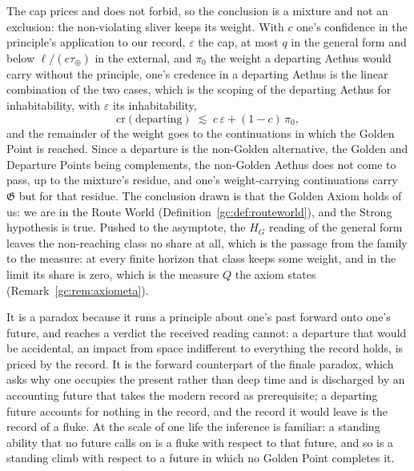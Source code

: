 \begin{remark}
The cap prices and does not forbid, so the conclusion is a mixture and
not an exclusion: the non-violating sliver keeps its weight. With $c$
one's confidence in the principle's application to our record,
$\varepsilon$ the cap, at most $q$ in the general form and below
$\ell/(e\tau_\oplus)$ in the external, and $\pi_0$ the weight a
departing Aethus would carry without the principle, one's credence in a
departing Aethus is the linear combination of the two cases, which is
the scoping of the departing Aethus for inhabitability, with
$\varepsilon$ its inhabitability,
\begin{equation}\label{gc:eq:departmix}
\mathrm{cr}(\text{departing})\;\lesssim\;c\,\varepsilon+(1-c)\,\pi_0,
\end{equation}
and the remainder of the weight goes to the continuations in which the
Golden Point is reached. Since a departure is the non-Golden
alternative, the Golden and Departure Points being complements, the
non-Golden Aethus does not come to pass, up to the mixture's residue,
and one's weight-carrying continuations carry $\mathfrak G$ but for that
residue. The conclusion drawn is that the Golden Axiom holds of us:
we are in the Route World (Definition~\ref{gc:def:routeworld}), and the
Strong hypothesis is true. Pushed to the asymptote, the $H_G$ reading of
the general form leaves the non-reaching class no share at all, which is
the passage from the family to the measure: at every finite horizon that
class keeps some weight, and in the limit its share is zero, which is
the measure $Q$ the axiom states (Remark~\ref{gc:rem:axiometa}).

It is a paradox because it runs a principle about one's past forward
onto one's future, and reaches a verdict the received reading cannot: a
departure that would be accidental, an impact from space indifferent to
everything the record holds, is priced by the record. It is the forward
counterpart of the finale paradox, which asks why one occupies the
present rather than deep time and is discharged by an accounting future
that takes the modern record as prerequisite; a departing future
accounts for nothing in the record, and the record it would leave is the
record of a fluke. At the scale of one life the inference is familiar: a
standing ability that no future calls on is a fluke with respect to that
future, and so is a standing climb with respect to a future in which no
Golden Point completes it.
\end{remark}

